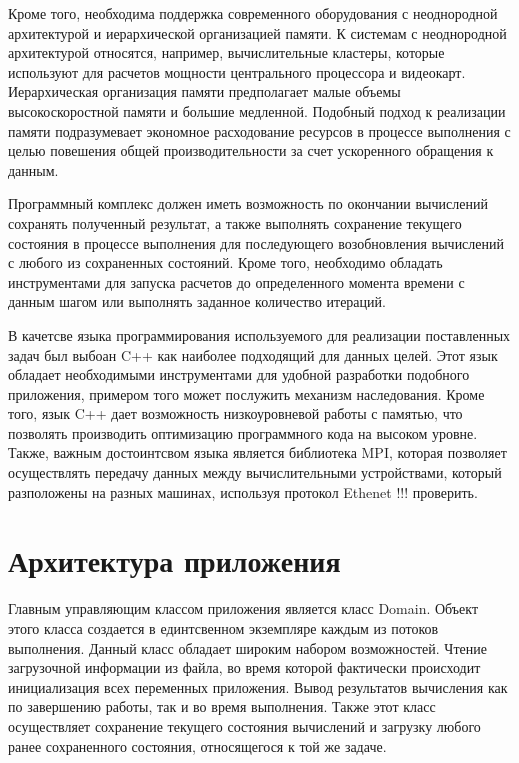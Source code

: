 \documentclass[a4paper, 14pt]{article}
\theoremstyle{definition}
\begin{document}
\par Кроме того, необходима поддержка современного оборудования с неоднородной архитектурой и иерархической организацией памяти. К системам с неоднородной архитектурой относятся, например, вычислительные кластеры, которые используют для расчетов мощности центрального процессора и видеокарт. Иерархическая организация памяти предполагает малые объемы высокоскоростной памяти и большие медленной. Подобный подход к реализации памяти подразумевает экономное расходование ресурсов в процессе выполнения с целью повешения общей производительности за счет ускоренного обращения к данным.

\par Программный комплекс должен иметь возможность по окончании вычислений сохранять полученный результат, а также выполнять сохранение текущего состояния в процессе выполнения для последующего возобновления вычислений с любого из сохраненных состояний. Кроме того, необходимо обладать инструментами для запуска расчетов до определенного момента времени с данным шагом или выполнять заданное количество итераций.

\par В качетсве языка программирования используемого для реализации поставленных задач был выбоан C++ как наиболее подходящий для данных целей. Этот язык обладает необходимыми инструментами для удобной разработки подобного приложения, примером того может послужить механизм наследования. Кроме того, язык C++ дает возможность низкоуровневой работы с памятью, что позволять производить оптимизацию программного кода на высоком уровне. Также, важным достоинтсвом языка является библиотека MPI, которая позволяет осуществлять передачу данных между вычислительными устройствами, который разположены на разных машинах, используя протокол Ethenet !!! проверить.

\newpage
\section{Архитектура приложения}

\par Главным управляющим классом приложения является класс Domain. Объект этого класса создается в единтсвенном экземпляре каждым из потоков выполнения. Данный класс обладает широким набором возможностей. Чтение загрузочной информации из файла, во время которой фактически происходит инициализация всех переменных приложения. Вывод результатов вычисления как по завершению работы, так и во время выполнения. Также этот класс осуществляет сохранение текущего состояния вычислений и загрузку любого ранее сохраненного состояния, относящегося к той же задаче.
\end{document}
